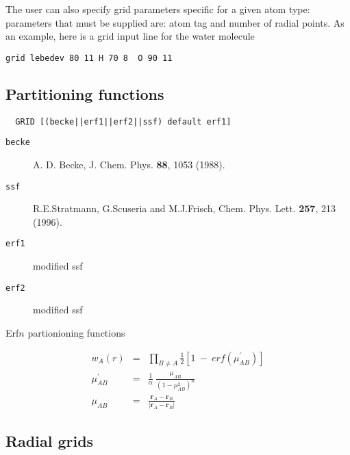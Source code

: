 The user can also specify grid parameters specific for a given atom type: 
parameters that must be supplied are: atom tag and number of radial points.
As an example, here is a grid input line for the water molecule
\begin{verbatim}
grid lebedev 80 11 H 70 8  O 90 11 
\end{verbatim}

%


\clearpage
\subsection{Partitioning functions}

\begin{verbatim}
  GRID [(becke||erf1||erf2||ssf) default erf1]
\end{verbatim}


\begin{description}
\item[\tt becke]  A. D. Becke, J. Chem. Phys. {\bf 88}, 1053 (1988).
\item[\tt ssf] R.E.Stratmann, G.Scuseria and  M.J.Frisch,
Chem. Phys. Lett. {\bf 257}, 213 (1996).
\item[\tt erf1] modified ssf
\item[\tt erf2] modified ssf
\end{description}

Erf$n$ partionioning functions

\begin{eqnarray*}
 w_A(r) & = & \prod_{B\neq A}\frac{1}{2} \left[1 \ - \
erf(\mu^\prime_{AB})\right] \\
 \mu^\prime_{AB} & = & \frac{1}{\alpha} \ \frac{\mu_{AB}}{(1-\mu_{AB}^2)^n}\\
 \mu_{AB} & = & \frac{{\mathbf r}_A - {\mathbf r}_B}
{\left|{\mathbf r}_A - {\mathbf r}_B \right|}
\end{eqnarray*}




\subsection{Radial grids}

